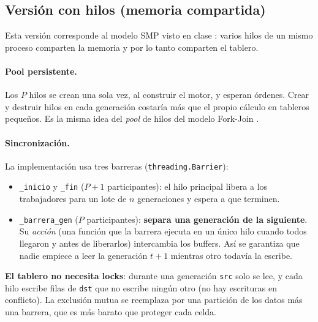 \documentclass[11pt,a4paper]{article}
\newcommand{\code}[1]{\texttt{#1}}
\begin{document}
\subsection{Versión con hilos (memoria compartida)}\label{sec:hilos}

Esta versión corresponde al modelo SMP visto en clase \cite{pastrana-smp}: varios hilos de un mismo proceso
comparten la memoria y por lo tanto comparten el tablero.

\paragraph{Pool persistente.} Los $P$ hilos se crean una sola vez, al construir el motor, y esperan órdenes.
Crear y destruir hilos en cada generación costaría más que el propio cálculo en tableros pequeños. Es la misma
idea del \emph{pool} de hilos del modelo Fork-Join \cite{forkjoin}.

\paragraph{Sincronización.} La implementación usa tres barreras (\code{threading.Barrier}):
\begin{itemize}
  \item \code{\_inicio} y \code{\_fin} ($P{+}1$ participantes): el hilo principal libera a los trabajadores
        para un lote de $n$ generaciones y espera a que terminen.
  \item \code{\_barrera\_gen} ($P$ participantes): \textbf{separa una generación de la siguiente}. Su
        \emph{acción} (una función que la barrera ejecuta en un único hilo cuando todos llegaron y
        antes de liberarlos) intercambia los buffers. Así se garantiza que nadie empiece a leer la generación
        $t{+}1$ mientras otro todavía la escribe.
\end{itemize}
\textbf{El tablero no necesita locks}: durante una generación \code{src} solo se lee, y cada hilo escribe
filas de \code{dst} que no escribe ningún otro (no hay escrituras en conflicto). La exclusión mutua se
reemplaza por una partición de los datos más una barrera, que es más barato que proteger cada celda.
\end{document}
